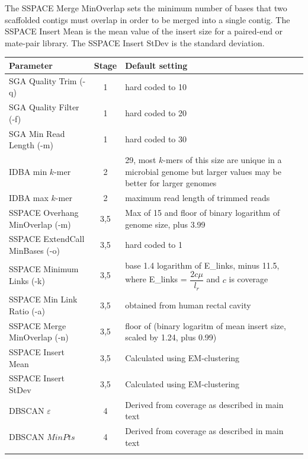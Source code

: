 \documentclass{bioinfo}
\begin{document}
The SSPACE Merge MinOverlap sets the minimum number of bases that two scaffolded contigs must overlap in order to be merged
into a single contig.  The SSPACE Insert Mean is the mean value of the insert size for a paired-end or mate-pair library. 
The SSPACE Insert StDev is the standard deviation.


\begin{table}[!t]
{\begin{tabular}{l|c|l}\toprule
Parameter                       & Stage & Default setting  \\\midrule
SGA Quality Trim (-q)           & 1     & hard coded to 10 \\
SGA Quality Filter (-f)         & 1     & hard coded to 20  \\
SGA Min Read Length (-m)        & 1     & hard coded to 30 \\
IDBA min $k$-mer                & 2     & 29, most $k$-mers of this size are unique in a microbial genome but larger values may be better for larger genomes \\
IDBA max $k$-mer                & 2     & maximum read length of trimmed reads \\
SSPACE Overhang MinOverlap (-m) & 3,5   & Max of 15 and floor of binary logarithm of genome size, plus 3.99  \\
SSPACE ExtendCall MinBases (-o) & 3,5   & hard coded to 1 \\
SSPACE Minimum Links (-k)       & 3,5   & base 1.4 logarithm of E\_links, minus 11.5, where E\_links = $\dfrac{2c\mu}{l_r}$ and $c$ is coverage \\
SSPACE Min Link Ratio (-a)      & 3,5   & obtained from human rectal cavity \\
SSPACE Merge MinOverlap (-n)    & 3,5   & floor of (binary logaritm of mean insert size, scaled by 1.24, plus 0.99) \\
SSPACE Insert Mean 	            & 3,5   & Calculated using EM-clustering \\
SSPACE Insert StDev             & 3,5   & Calculated using EM-clustering \\
DBSCAN $\varepsilon$            & 4     & Derived from coverage as described in main text \\
DBSCAN $MinPts$                 & 4     & Derived from coverage as described in main text \\
\botrule \\
\end{tabular}}{}
\end{table}
\end{document}
